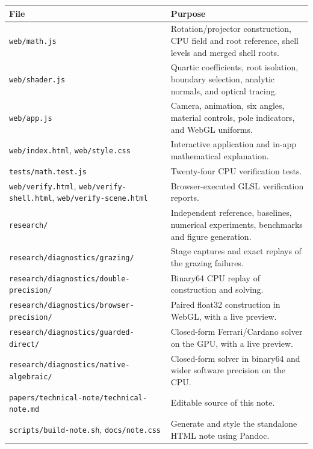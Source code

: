 \documentclass[11pt,a4paper]{article}
\begin{document}
{
\begin{longtable}[]{@{}
  >{\raggedright\arraybackslash}p{}
  >{\raggedright\arraybackslash}p{}@{}}
\toprule\noalign{}
\begin{minipage}[b]{\linewidth}\raggedright
File
\end{minipage} & \begin{minipage}[b]{\linewidth}\raggedright
Purpose
\end{minipage} \\
\midrule\noalign{}
\endhead
\bottomrule\noalign{}
\endlastfoot
\texttt{web/math.js} & Rotation/projector construction, CPU field and
root reference, shell levels and merged shell roots. \\
\texttt{web/shader.js} & Quartic coefficients, root isolation, boundary
selection, analytic normals, and optical tracing. \\
\texttt{web/app.js} & Camera, animation, six angles, material controls,
pole indicators, and WebGL uniforms. \\
\texttt{web/index.html}, \texttt{web/style.css} & Interactive
application and in-app mathematical explanation. \\
\texttt{tests/math.test.js} & Twenty-four CPU verification tests. \\
\texttt{web/verify.html}, \texttt{web/verify-shell.html},
\texttt{web/verify-scene.html} & Browser-executed GLSL verification
reports. \\
\texttt{research/} & Independent reference, baselines, numerical
experiments, benchmarks and figure generation. \\
\texttt{research/diagnostics/grazing/} & Stage captures and exact
replays of the grazing failures. \\
\texttt{research/diagnostics/double-precision/} & Binary64 CPU replay of
construction and solving. \\
\texttt{research/diagnostics/browser-precision/} & Paired float32
construction in WebGL, with a live preview. \\
\texttt{research/diagnostics/guarded-direct/} & Closed-form
Ferrari/Cardano solver on the GPU, with a live preview. \\
\texttt{research/diagnostics/native-algebraic/} & Closed-form solver in
binary64 and wider software precision on the CPU. \\
\texttt{papers/technical-note/technical-note.md} & Editable source of
this note. \\
\texttt{scripts/build-note.sh}, \texttt{docs/note.css} & Generate and
style the standalone HTML note using Pandoc. \\
\end{longtable}
}
\end{document}
